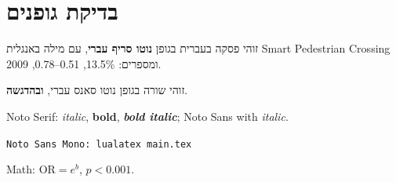 \documentclass[11pt]{article}
\begin{document}
\section{בדיקת גופנים}
זוהי פסקה בעברית בגופן \textbf{נוטו סריף עברי}, עם מילה באנגלית
\foreignlanguage{english}{Smart Pedestrian Crossing} ומספרים: 13.5\%, 0.51--0.78, 2009.

{\sffamily זוהי שורה בגופן נוטו סאנס עברי, \textbf{ובהדגשה}.}

\begin{otherlanguage}{english}
Noto Serif: \textit{italic}, \textbf{bold}, \textbf{\textit{bold italic}};
{\sffamily Noto Sans with \textit{italic}}.

\texttt{Noto Sans Mono: lualatex main.tex}

Math: $\mathrm{OR} = e^{b}$, $p < 0.001$.
\end{otherlanguage}
\end{document}

